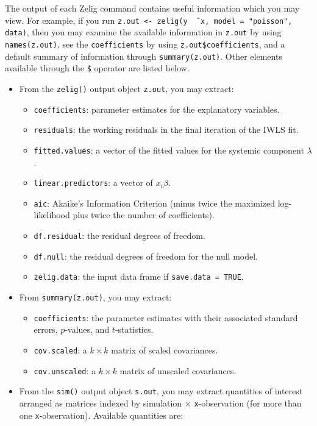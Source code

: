 \documentclass{article}
\begin{document}
The output of each Zelig command contains useful information which you
may view.  For example, if you run \texttt{z.out <- zelig(y \~\,
  x, model = "poisson", data)}, then you may examine the available
information in \texttt{z.out} by using \texttt{names(z.out)},
see the {\tt coefficients} by using {\tt z.out\$coefficients}, and
a default summary of information through \texttt{summary(z.out)}.
Other elements available through the {\tt \$} operator are listed
below.

\begin{itemize}
\item From the {\tt zelig()} output object {\tt z.out}, you may extract:
   \begin{itemize}
   \item {\tt coefficients}: parameter estimates for the explanatory
     variables.
   \item {\tt residuals}: the working residuals in the final iteration
     of the IWLS fit.
   \item {\tt fitted.values}: a vector of the fitted values for the systemic
     component $\lambda$.  
   \item {\tt linear.predictors}: a vector of $x_{i}\beta$.  
   \item {\tt aic}: Akaike's Information Criterion (minus twice the
     maximized log-likelihood plus twice the number of coefficients).
   \item {\tt df.residual}: the residual degrees of freedom.
   \item {\tt df.null}: the residual degrees of freedom for the null
     model.
   \item {\tt zelig.data}: the input data frame if {\tt save.data = TRUE}.  
   \end{itemize}

\item From {\tt summary(z.out)}, you may extract: 
   \begin{itemize}
   \item {\tt coefficients}: the parameter estimates with their
     associated standard errors, $p$-values, and $t$-statistics.
   \item{\tt cov.scaled}: a $k \times k$ matrix of scaled covariances.
   \item{\tt cov.unscaled}: a $k \times k$ matrix of unscaled
     covariances.  
   \end{itemize}

\item From the {\tt sim()} output object {\tt s.out}, you may extract
  quantities of interest arranged as matrices indexed by simulation
  $\times$ {\tt x}-observation (for more than one {\tt x}-observation).
  Available quantities are:


\end{itemize}
\end{document}
